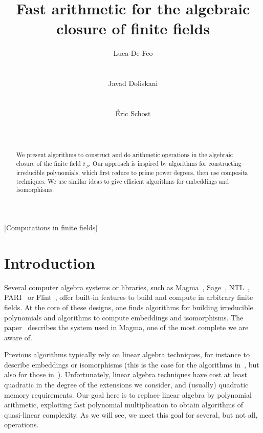 \documentclass{sig-alternate}
\author{
  \alignauthor Luca De Feo\\
  \affaddr{Laboratoire PRiSM}\\
  \affaddr{Universit\'e de Versailles}\\
  \email{luca.de-feo@uvsq.fr}
  \alignauthor Javad Doliskani\\
  \affaddr{Computer Science Department}\\
  \affaddr{Western University}\\
  \email{jdoliska@uwo.ca}
  \alignauthor \'Eric Schost\\
  \affaddr{Computer Science Department}\\
  \affaddr{Western University}\\
  \email{eschost@uwo.ca}
}
\title{Fast arithmetic for the algebraic closure of finite fields}
\newcounter{algo}
\begin{document}
\maketitle
\begin{abstract}
  We present algorithms to construct and do arithmetic operations in
  the algebraic closure of the finite field $\mathbb{F}_p$. Our
  approach is inspired by algorithms for constructing irreducible
  polynomials, which first reduce to prime power degrees, then use
  composita techniques. We use similar ideas to give efficient
  algorithms for embeddings and isomorphisms.
\end{abstract}

[Computations in finite fields]


\section{Introduction}

Several computer algebra systems or libraries, such as
Magma~\cite{MAGMA}, Sage~\cite{Sage}, NTL~\cite{shoup2003ntl},
PARI~\cite{Pari} or Flint~\cite{hart2010flint}, offer built-in
features to build and compute in arbitrary finite fields. At the core
of these designs, one finds algorithms for building irreducible
polynomials and algorithms to compute embeddings and isomorphisms. The
paper~\cite{bosma+cannon+steel97} describes the system used in Magma,
one of the most complete we are aware of.

Previous algorithms typically rely on linear algebra techniques, for
instance to describe embeddings or isomorphisms (this is the case for
the algorithms in~\cite{bosma+cannon+steel97}, but also for those
in~\cite{LenstraJr91,Allombert02}). Unfortunately, linear algebra
techniques have cost at least quadratic in the degree of the
extensions we consider, and (usually) quadratic memory requirements.
Our goal here is to replace linear algebra by polynomial arithmetic,
exploiting fast polynomial multiplication to obtain algorithms of
quasi-linear complexity. As we will see, we meet this goal for
several, but not all, operations.
\end{document}
